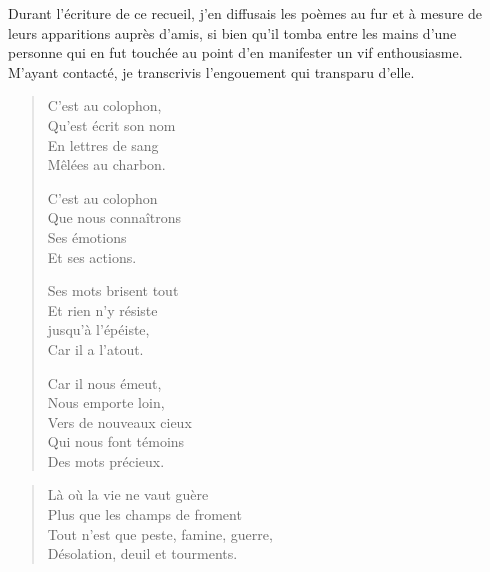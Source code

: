 \begin{prose}
  Durant l’écriture de ce recueil, j’en diffusais les poèmes au fur et à mesure de leurs apparitions auprès d’amis, si bien qu’il tomba entre les mains d’une personne qui en fut touchée au point d’en manifester un vif enthousiasme.
  M’ayant contacté, je transcrivis l’engouement qui transparu d’elle.
\end{prose}


\begin{verse}%
  \quatrain%
  C’est au colophon,\\  %
  Qu’est écrit son nom\\  %
  En lettres de sang\\  %
  Mêlées au charbon.

  C’est au colophon\\  %
  Que nous connaîtrons\\  %
  Ses émotions\\  %
  Et ses actions.

  Ses mots brisent tout\\  %
  Et rien n’y résiste\\  %
  jusqu’à l’épéiste,\\  %
  Car il a l’atout.

  Car il nous émeut,\\  %
  Nous emporte loin,\\  %
  Vers de nouveaux cieux\\  %
  Qui nous font témoins\\  %
  Des mots précieux.
\end{verse}


\begin{verse}%
  \quatrain%
  Là où la vie ne vaut guère\\  %
  Plus que les champs de froment\\  %
  Tout n’est que peste, famine, guerre,\\  %
  Désolation, deuil et tourments.
\end{verse}

